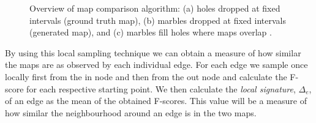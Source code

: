 \begin{figure}[H]%
 \centering
 
 
 \caption{Overview of map comparison algorithm: (a) holes dropped at fixed intervals (ground truth map), (b) marbles dropped at fixed intervals (generated map), and (c) marbles fill holes where maps overlap \citep{4inBiagioni}.}%
 \label{fig:method/topo}
\end{figure}

By using this local sampling technique we can obtain a measure of how similar the maps are as observed by each individual edge. For each edge we sample once locally first from the in node and then from the out node and calculate the F-score for each respective starting point. We then calculate the \textit{local signature}, $\Delta_e$, of an edge as the mean of the obtained F-scores. This value will be a measure of how similar the neighbourhood around an edge is in the two maps.


